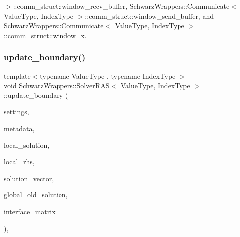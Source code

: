 $>$\+::comm\+\_\+struct\+::window\+\_\+recv\+\_\+buffer, Schwarz\+Wrappers\+::\+Communicate$<$ Value\+Type, Index\+Type $>$\+::comm\+\_\+struct\+::window\+\_\+send\+\_\+buffer, and Schwarz\+Wrappers\+::\+Communicate$<$ Value\+Type, Index\+Type $>$\+::comm\+\_\+struct\+::window\+\_\+x.

\mbox{\label{classSchwarzWrappers_1_1SolverRAS_a1a741b69e1cd7623c6e2d8467aedaa7c}} 
\subsubsection{\texorpdfstring{update\+\_\+boundary()}{update\_boundary()}}
{\footnotesize\ttfamily template$<$typename Value\+Type , typename Index\+Type $>$ \\
void \hyperlink{classSchwarzWrappers_1_1SolverRAS}{Schwarz\+Wrappers\+::\+Solver\+R\+AS}$<$ Value\+Type, Index\+Type $>$\+::update\+\_\+boundary (\begin{DoxyParamCaption}\item[{const \hyperlink{structSchwarzWrappers_1_1Settings}{Settings} \&}]{settings,  }\item[{const \hyperlink{structSchwarzWrappers_1_1Metadata}{Metadata}$<$ Value\+Type, Index\+Type $>$ \&}]{metadata,  }\item[{std\+::shared\+\_\+ptr$<$ gko\+::matrix\+::\+Dense$<$ Value\+Type $>$$>$ \&}]{local\+\_\+solution,  }\item[{const std\+::shared\+\_\+ptr$<$ gko\+::matrix\+::\+Dense$<$ Value\+Type $>$$>$ \&}]{local\+\_\+rhs,  }\item[{const std\+::shared\+\_\+ptr$<$ gko\+::matrix\+::\+Dense$<$ Value\+Type $>$$>$ \&}]{solution\+\_\+vector,  }\item[{std\+::shared\+\_\+ptr$<$ gko\+::matrix\+::\+Dense$<$ Value\+Type $>$$>$ \&}]{global\+\_\+old\+\_\+solution,  }\item[{const std\+::shared\+\_\+ptr$<$ gko\+::matrix\+::\+Csr$<$ Value\+Type, Index\+Type $>$$>$ \&}]{interface\+\_\+matrix }\end{DoxyParamCaption})\hspace{0.3cm}{\ttfamily [override]}, {\ttfamily [virtual]}}



